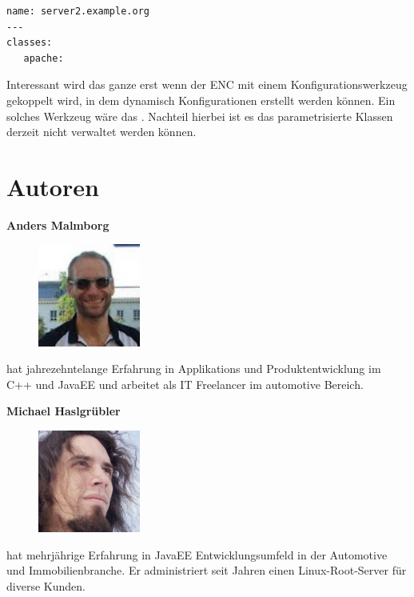 \documentclass[12pt,a4paper,ngerman]{article}
\begin{document}
\begin{lstlisting}[caption=YAML, label=puppet-enc-yaml]
name: server2.example.org
---
classes: 
   apache:
\end{lstlisting} 

Interessant wird das ganze erst wenn der ENC mit einem Konfigurationswerkzeug gekoppelt wird, in dem dynamisch Konfigurationen erstellt werden können. Ein solches Werkzeug wäre das \cite{puppetdashboard}. Nachteil hierbei ist es das parametrisierte Klassen derzeit nicht verwaltet werden können. 


\section*{Autoren}

\newcommand{\authorboxheight}{5cm}
\begin{minipage}[t][\authorboxheight]{0.45\textwidth}
\textbf{Anders Malmborg}
\vskip0.3cm
\begin{figure}
\vspace{-20pt}
\includegraphics[width=0.3\textwidth]{images/anders.jpg}
\vspace{-20pt}
\end{figure}
hat jahrezehntelange Erfahrung in Applikations und Produktentwicklung im C++ und JavaEE  und arbeitet als IT Freelancer im automotive Bereich. 
\end{minipage}
\hspace{0.1\textwidth}
\begin{minipage}[t][\authorboxheight]{0.45\textwidth}
\textbf{Michael Haslgrübler}
\vskip0.3cm
\begin{figure}
\vspace{-20pt}
\includegraphics[width=0.3\textwidth]{images/michael.jpg}
\vspace{-20pt}
\end{figure}
hat mehrjährige Erfahrung in JavaEE Entwicklungsumfeld in der Automotive und Immobilienbranche. Er administriert seit Jahren einen Linux-Root-Server für diverse Kunden.
\end{minipage}



\end{document}
